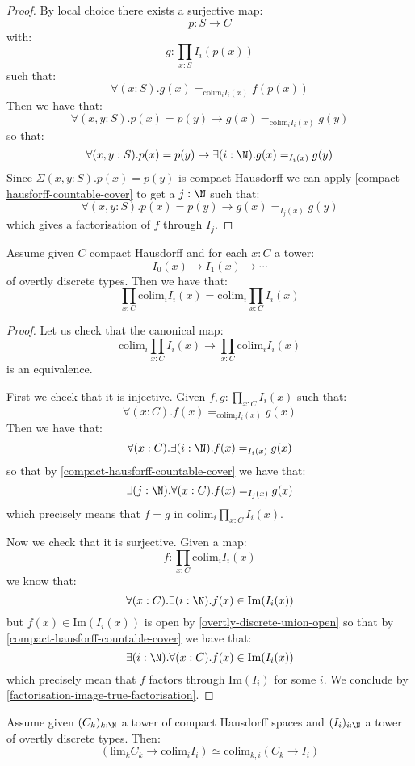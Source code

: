 \begin{proof}
By local choice there exists a surjective map:
\[p:S\to C\]
with:
\[g:\prod_{x:S} I_i(p(x))\]
such that:
\[\forall(x:S). g(x) =_{\mathrm{colim}_i I_i(x)} f(p(x))\]
Then we have that:
\[\forall(x,y:S). p(x)=p(y) \to g(x) =_{\mathrm{colim}_i I_i(x)} g(y)\]
so that:
\[\forall(x,y:S). p(x)=p(y) \to \exists(i:\N). g(x) =_{I_i(x)} g(y)\]
Since $\Sigma(x,y:S). p(x)=p(y)$ is compact Hausdorff we can apply \cref{compact-hausforff-countable-cover} to get a $j:\N$ such that:
\[\forall(x,y:S). p(x)=p(y) \to g(x) =_{I_j(x)} g(y)\]
which gives a factorisation of $f$ through $I_j$.
\end{proof}

\begin{proposition}\label{scott-continuity-right}
Assume given $C$ compact Hausdorff and for each $x:C$ a tower:
\[I_0(x)\to I_1(x)\to \cdots\]
of overtly discrete types. Then we have that:
\[\prod_{x:C} \mathrm{colim}_{i} I_i(x) = \mathrm{colim}_{i} \prod_{x:C} I_i(x)\]
\end{proposition}

\begin{proof}
Let us check that the canonical map:
\[\mathrm{colim}_i \prod_{x:C} I_i(x) \to \prod_{x:C} \mathrm{colim}_i I_i(x) \]
is an equivalence. 

First we check that it is injective. Given $f,g:\prod_{x:C} I_i(x)$ such that:
\[\forall(x:C).  f(x) =_{\mathrm{colim}_iI_i(x)} g(x)\]
Then we have that:
\[\forall(x:C).  \exists(i:\N). f(x) =_{I_i(x)} g(x)\]
so that by \cref{compact-hausforff-countable-cover} we have that:
\[\exists(j:\N). \forall(x:C). f(x) =_{I_j(x)} g(x)\]
which precisely means that $f=g$ in $\mathrm{colim}_i \prod_{x:C} I_i(x)$.

Now we check that it is surjective. Given a map:
\[f: \prod_{x:C} \mathrm{colim}_i I_i(x)\]
we know that:
\[\forall(x:C). \exists(i:\N). f(x)\in \mathrm{Im}(I_i(x))\]
but $f(x)\in \mathrm{Im}(I_i(x))$ is open by \cref{overtly-discrete-union-open} so that by \cref{compact-hausforff-countable-cover} we have that:
\[\exists(i:\N). \forall(x:C).  f(x)\in \mathrm{Im}(I_i(x))\]
which precisely mean that $f$ factors through $\mathrm{Im}(I_i)$ for some $i$. We conclude by \cref{factorisation-image-true-factorisation}.
\end{proof}

\begin{proposition}\label{scott-continuity}
Assume given $(C_k)_{k:\N}$ a tower of compact Hausdorff spaces and $(I_i)_{i:\N}$ a tower of overtly discrete types. Then:
\[\left( \mathrm{lim}_k C_k \to \mathrm{colim}_i I_i\right) \simeq \mathrm{colim}_{k,i} (C_k\to I_i)\]
\end{proposition}

